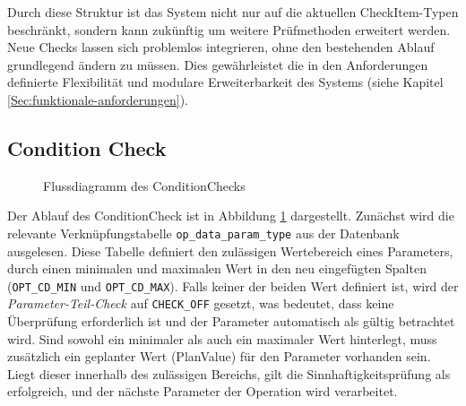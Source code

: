 Durch diese Struktur ist das System nicht nur auf die aktuellen CheckItem-Typen beschränkt, sondern kann zukünftig um weitere Prüfmethoden erweitert werden. Neue Checks lassen sich problemlos integrieren, ohne den bestehenden Ablauf grundlegend ändern zu müssen. Dies gewährleistet die in den Anforderungen definierte Flexibilität und modulare Erweiterbarkeit des Systems (siehe Kapitel \ref{Sec:funktionale-anforderungen}).

\subsection{Condition Check}
\begin{figure}[!htb]
    \centering
    \caption{Flussdiagramm des \gls{ConditionCheck}s}
    \label{fig:condition-check}
\end{figure}

Der Ablauf des \gls{ConditionCheck} ist in Abbildung \ref{fig:condition-check} dargestellt. Zunächst wird die relevante Verknüpfungstabelle \texttt{op\_data\_param\_type} aus der Datenbank ausgelesen. Diese Tabelle definiert den zulässigen Wertebereich eines Parameters, durch einen minimalen und maximalen Wert in den neu eingefügten Spalten (\texttt{OPT\_CD\_MIN} und \texttt{OPT\_CD\_MAX}). Falls keiner der beiden Wert definiert ist, wird der \textit{Parameter-Teil-Check} auf \texttt{CHECK\_OFF} gesetzt, was bedeutet, dass keine Überprüfung erforderlich ist und der Parameter automatisch als gültig betrachtet wird. Sind sowohl ein minimaler als auch ein maximaler Wert hinterlegt, muss zusätzlich ein geplanter Wert (PlanValue) für den Parameter vorhanden sein. Liegt dieser innerhalb des zulässigen Bereichs, gilt die Sinnhaftigkeitsprüfung als erfolgreich, und der nächste Parameter der Operation wird verarbeitet. 

